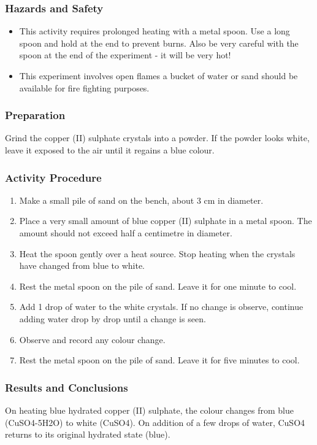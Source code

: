 \subsubsection*{Hazards and Safety}
\begin{itemize}
\item{This activity requires prolonged heating with a metal spoon. Use a long spoon and hold at the end to prevent burns. Also be very careful with the spoon at the end of the experiment - it will be very hot!}
\item{This experiment involves open flames a bucket of water or sand should be available for fire fighting purposes.}
\end{itemize}

\subsubsection*{Preparation}
Grind the copper (II) sulphate crystals into a powder. If the powder looks white, leave it exposed to the air until it regains a blue colour.

\subsubsection*{Activity Procedure}
\begin{enumerate}
\item{Make a small pile of sand on the bench, about 3 cm in diameter.}
\item{Place a very small amount of blue copper (II) sulphate in a metal spoon. The amount should not exceed half a centimetre in diameter.}
\item{Heat the spoon gently over a heat source. Stop heating when the crystals have changed from blue to white.}
\item{Rest the metal spoon on the pile of sand. Leave it for one minute to cool.}
\item{Add 1 drop of water to the white crystals. If no change is observe, continue adding water drop by drop until a change is seen.}
\item{Observe and record any colour change.}
\item{Rest the metal spoon on the pile of sand. Leave it for five minutes to cool.}
\end{enumerate}

\subsubsection*{Results and Conclusions}
On heating blue hydrated copper (II) sulphate, the colour changes from blue (CuSO4-5H2O) to white (CuSO4). On addition of a few drops of water, CuSO4 returns to its original hydrated state (blue).

